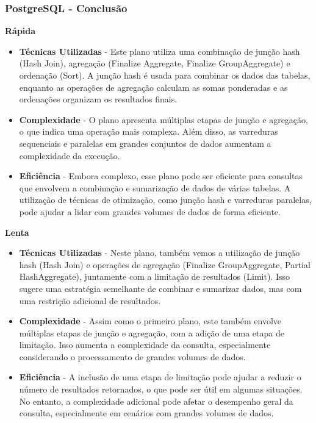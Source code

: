\documentclass{article}
\begin{document}
\subsubsection{PostgreSQL - Conclusão}


\textbf{Rápida}\\
\begin{itemize}
  \item \textbf{Técnicas Utilizadas} - Este plano utiliza uma combinação de junção hash (Hash Join), agregação (Finalize Aggregate, Finalize GroupAggregate) e ordenação (Sort). A junção hash é usada para combinar os dados das tabelas, enquanto as operações de agregação calculam as somas ponderadas e as ordenações organizam os resultados finais.
  \item \textbf{Complexidade} - O plano apresenta múltiplas etapas de junção e agregação, o que indica uma operação mais complexa. Além disso, as varreduras sequenciais e paralelas em grandes conjuntos de dados aumentam a complexidade da execução.
  \item \textbf{Eficiência} - Embora complexo, esse plano pode ser eficiente para consultas que envolvem a combinação e sumarização de dados de várias tabelas. A utilização de técnicas de otimização, como junção hash e varreduras paralelas, pode ajudar a lidar com grandes volumes de dados de forma eficiente.
\end{itemize}

\textbf{Lenta}\\
\begin{itemize}
  \item \textbf{Técnicas Utilizadas} - Neste plano, também vemos a utilização de junção hash (Hash Join) e operações de agregação (Finalize GroupAggregate, Partial HashAggregate), juntamente com a limitação de resultados (Limit). Isso sugere uma estratégia semelhante de combinar e sumarizar dados, mas com uma restrição adicional de resultados.
  \item \textbf{Complexidade} - Assim como o primeiro plano, este também envolve múltiplas etapas de junção e agregação, com a adição de uma etapa de limitação. Isso aumenta a complexidade da consulta, especialmente considerando o processamento de grandes volumes de dados.
  \item \textbf{Eficiência} - A inclusão de uma etapa de limitação pode ajudar a reduzir o número de resultados retornados, o que pode ser útil em algumas situações. No entanto, a complexidade adicional pode afetar o desempenho geral da consulta, especialmente em cenários com grandes volumes de dados.

\end{itemize}
\end{document}
